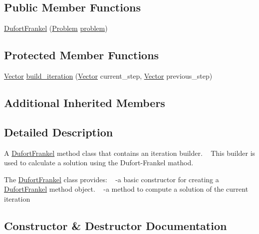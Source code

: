 \subsection*{Public Member Functions}
\begin{DoxyCompactItemize}
\item 
\hyperlink{classDufortFrankel_a3da0cebb23f1c23c8656b5d39824b22b}{Dufort\+Frankel} (\hyperlink{classProblem}{Problem} \hyperlink{classMethod_a29a08a679b5d30a8c813766308205041}{problem})
\end{DoxyCompactItemize}
\subsection*{Protected Member Functions}
\begin{DoxyCompactItemize}
\item 
\hyperlink{classVector}{Vector} \hyperlink{classDufortFrankel_ae140760ed55ca045a2136e6e882cecd4}{build\+\_\+iteration} (\hyperlink{classVector}{Vector} current\+\_\+step, \hyperlink{classVector}{Vector} previous\+\_\+step)
\end{DoxyCompactItemize}
\subsection*{Additional Inherited Members}


\subsection{Detailed Description}
A \hyperlink{classDufortFrankel}{Dufort\+Frankel} method class that contains an iteration builder. ~\newline
 This builder is used to calculate a solution using the Dufort-\/\+Frankel mathod.

The \hyperlink{classDufortFrankel}{Dufort\+Frankel} class provides\+: ~\newline
-\/a basic constructor for creating a \hyperlink{classDufortFrankel}{Dufort\+Frankel} method object. ~\newline
-\/a method to compute a solution of the current iteration 

\subsection{Constructor \& Destructor Documentation}
